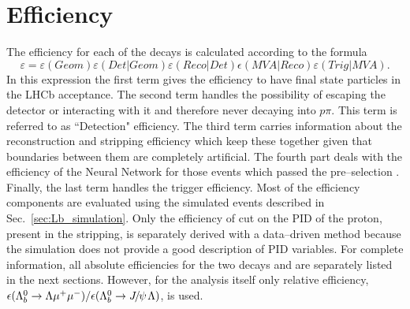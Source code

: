 \chapter{Efficiency}
\label{sec:Lb_eff}

The efficiency for each of the decays is calculated according to the formula
\begin{equation}
\varepsilon=\varepsilon(Geom)\varepsilon(Det|Geom)\varepsilon(Reco|Det)\epsilon(MVA|Reco)\varepsilon(Trig|MVA).
\end{equation}
In this expression the first term gives the efficiency to have final state particles in the LHCb acceptance.
The second term handles the possibility of \Lz escaping the detector or interacting with it and therefore
never decaying into $p\pi$. This term is referred to as ``Detection" efficiency.
The third term carries information about the reconstruction and stripping efficiency
which keep these together given that boundaries between them are completely artificial.
The fourth part deals with the efficiency of the Neural Network for those events which passed the pre--selection . 
Finally, the last term handles the trigger efficiency.
Most of the efficiency components are evaluated using the simulated events described in Sec.~\ref{sec:Lb_simulation}.
Only the efficiency of cut on the PID of the proton, present in the stripping, is separately derived
with a data--driven method because the simulation does not provide a good description of PID variables.
For complete information, all absolute efficiencies for the two decays \Lb\to\Lz\mumu and \Lb\to\jpsi\Lz are
separately listed in the next sections. However, for the analysis itself only relative efficiency,
$\epsilon(\Lb\to\Lz\mumu)/\epsilon(\Lb\to\jpsi\Lz)$, is used. 



